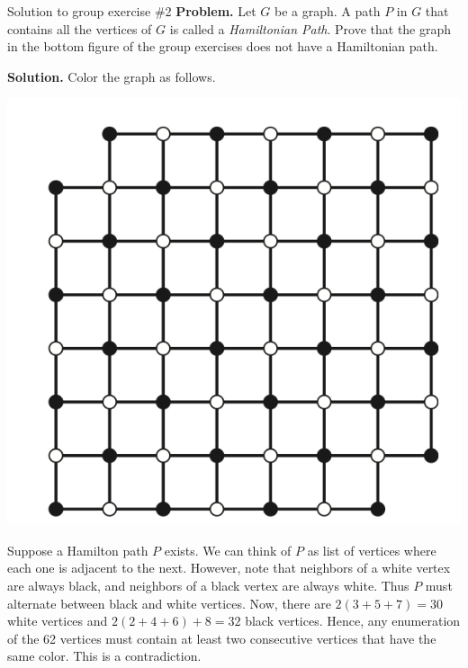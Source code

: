 \documentclass[10pt]{beamer}
\begin{document}
\begin{frame}{Solution to group exercise \#2}
\small 
\noindent
\textbf{Problem.} Let $G$ be a graph.  A path $P$ in $G$ that contains all the vertices of $G$ is called a \textit{Hamiltonian Path}.  Prove that the graph in the bottom figure of the group exercises does not have a Hamiltonian path.

\vfill 
\textbf{Solution.}  Color the graph as follows.
\begin{center}
    \includegraphics[width=.25\textwidth]{images/connection_hint} %
\end{center}

Suppose a Hamilton path $P$ exists.  We can think of $P$ as list of vertices where each one is adjacent to the next. However, note that neighbors of a white vertex are always black, and neighbors of a black vertex are always white.   Thus $P$ must alternate between black and white vertices.  Now, there are $2(3+5+7)=30$ white vertices and $2(2+4+6) + 8 = 32$ black vertices.  Hence, any enumeration of the 62 vertices must contain at least two consecutive vertices that have the same color. This is a contradiction. 
\end{frame}
\end{document}
